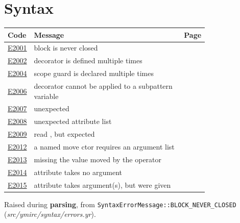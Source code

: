 
\clearpage
\section{Syntax}
\label{sec:codes:syntax}

\begin{longtable}{@{}l p{0.78\linewidth} r@{}}
\toprule Code & Message & Page\\ \midrule \endhead
\hyperref[sec:codes:e2001]{E2001} & block is never closed & \pageref{sec:codes:e2001}\\
\hyperref[sec:codes:e2002]{E2002} & decorator \errhole{} is defined multiple times & \pageref{sec:codes:e2002}\\
\hyperref[sec:codes:e2004]{E2004} & scope guard \errhole{} is declared multiple times & \pageref{sec:codes:e2004}\\
\hyperref[sec:codes:e2006]{E2006} & decorator \errhole{} cannot be applied to a subpattern variable & \pageref{sec:codes:e2006}\\
\hyperref[sec:codes:e2007]{E2007} & unexpected \errhole{} & \pageref{sec:codes:e2007}\\
\hyperref[sec:codes:e2008]{E2008} & unexpected attribute list \errhole{} & \pageref{sec:codes:e2008}\\
\hyperref[sec:codes:e2009]{E2009} & read \errhole{}, but expected \errhole{} & \pageref{sec:codes:e2009}\\
\hyperref[sec:codes:e2012]{E2012} & a named move ctor requires an argument list & \pageref{sec:codes:e2012}\\
\hyperref[sec:codes:e2013]{E2013} & missing the value moved by the operator & \pageref{sec:codes:e2013}\\
\hyperref[sec:codes:e2014]{E2014} & attribute \errhole{} takes no argument & \pageref{sec:codes:e2014}\\
\hyperref[sec:codes:e2015]{E2015} & attribute \errhole{} takes \errhole{} argument(s), but \errhole{} were given & \pageref{sec:codes:e2015}\\
\bottomrule
\end{longtable}

\label{sec:codes:e2001}

Raised during \textbf{parsing}, from \texttt{SyntaxErrorMessage::\allowbreak{}BLOCK\_\allowbreak{}NEVER\_\allowbreak{}CLOSED} (\textit{src/\allowbreak{}ymirc/\allowbreak{}syntax/\allowbreak{}errors.yr}).


